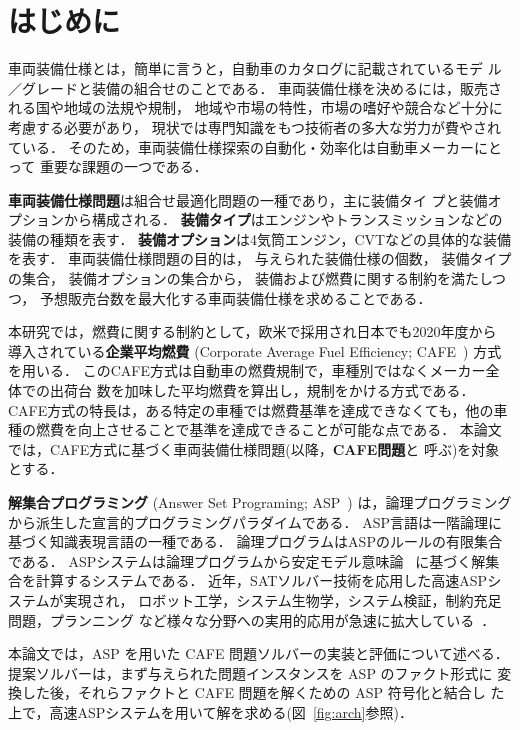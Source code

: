 \section{はじめに}\label{sec:introduction}


車両装備仕様とは，簡単に言うと，自動車のカタログに記載されているモデ
ル／グレードと装備の組合せのことである．
車両装備仕様を決めるには，販売される国や地域の法規や規制，
地域や市場の特性，市場の嗜好や競合など十分に考慮する必要があり，
現状では専門知識をもつ技術者の多大な労力が費やされている．
そのため，車両装備仕様探索の自動化・効率化は自動車メーカーにとって
重要な課題の一つである．

\textbf{車両装備仕様問題}は組合せ最適化問題の一種であり，主に装備タイ
プと装備オプションから構成される．
\textbf{装備タイプ}はエンジンやトランスミッションなどの装備の種類を表す．
\textbf{装備オプション}は4気筒エンジン，CVTなどの具体的な装備を表す．
車両装備仕様問題の目的は，
与えられた装備仕様の個数，
装備タイプの集合，
装備オプションの集合から，
装備および燃費に関する制約を満たしつつ，
予想販売台数を最大化する車両装備仕様を求めることである．

本研究では，燃費に関する制約として，欧米で採用され日本でも2020年度から
導入されている\textbf{企業平均燃費}
(Corporate Average Fuel Efficiency; CAFE~\cite{metimlit18:cafe})
方式を用いる．
このCAFE方式は自動車の燃費規制で，車種別ではなくメーカー全体での出荷台
数を加味した平均燃費を算出し，規制をかける方式である．
CAFE方式の特長は，ある特定の車種では燃費基準を達成できなくても，他の車
種の燃費を向上させることで基準を達成できることが可能な点である．
本論文では，CAFE方式に基づく車両装備仕様問題(以降，\textbf{CAFE問題}と
呼ぶ)を対象とする．

\textbf{解集合プログラミング}
(Answer Set Programing; ASP~\cite{%
  Baral03:cambridge,%
  Gelfond88:iclp,%
  Inoue08:jssst})
は，論理プログラミングから派生した宣言的プログラミングパラダイムである．
ASP言語は一階論理に基づく知識表現言語の一種である．
論理プログラムはASPのルールの有限集合である．
ASPシステムは論理プログラムから安定モデル意味論~\cite{Gelfond88:iclp}
に基づく解集合を計算するシステムである．
近年，SATソルバー技術を応用した高速ASPシステムが実現され，
ロボット工学，システム生物学，システム検証，制約充足問題，プランニング
など様々な分野への実用的応用が急速に拡大している~\cite{Gelfond16:aim}．

本論文では，ASP を用いた CAFE 問題ソルバーの実装と評価について述べる．
提案ソルバーは，まず与えられた問題インスタンスを ASP のファクト形式に
変換した後，それらファクトと CAFE 問題を解くための ASP 符号化と結合し
た上で，高速ASPシステムを用いて解を求める(図~\ref{fig:arch}参照)．

